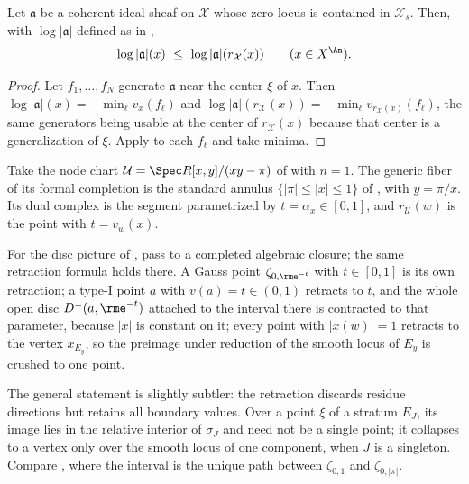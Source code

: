 \begin{corollary}
\label{cor:retraction-ideal-monotone}
Let $\mathfrak a$ be a coherent ideal sheaf on $\mathcal X$ whose
zero locus is contained in $\mathcal X_s$. Then, with
$\log|\mathfrak a|$ defined as in
,
\[
 \log|\mathfrak a|(x)\ \le\ \log|\mathfrak a|(r_{\mathcal X}(x))
 \qquad(x\in X^{\An}).
\]
\end{corollary}

\begin{proof}
Let $f_1,\ldots,f_N$ generate $\mathfrak a$ near the center $\xi$ of
$x$. Then
$\log|\mathfrak a|(x)=-\min_\ell v_x(f_\ell)$ and
$\log|\mathfrak a|(r_{\mathcal X}(x))=-\min_\ell
v_{r_{\mathcal X}(x)}(f_\ell)$, the same generators being usable at the
center of $r_{\mathcal X}(x)$ because that center is a generalization of
$\xi$. Apply  to each $f_\ell$ and take
minima.
\end{proof}

\begin{example}
\label{ex:retraction-annulus}
Take the node chart $\mathcal U=\Spec R[x,y]/(xy-\pi)$ of
 with $n=1$. The generic fiber of its formal
completion is the standard annulus $\{|\pi|\le|x|\le1\}$ of
, with
$y=\pi/x$. Its dual complex is the segment parametrized by
$t=\alpha_x\in[0,1]$, and $r_{\mathcal U}(w)$ is the point with
$t=v_w(x)$.

For the disc picture of , pass to a
completed algebraic closure; the same retraction formula holds there.
A Gauss point
$\zeta_{0,\rme^{-t}}$ with $t\in[0,1]$ is its own retraction; a type-I
point $a$ with $v(a)=t\in(0,1)$ retracts to $t$, and the whole open
disc $D^-(a,\rme^{-t})$ attached to the interval there is contracted to
that parameter, because $|x|$ is constant on it; every point with
$|x(w)|=1$ retracts to the vertex $x_{E_y}$, so the preimage under
reduction of the smooth locus of $E_y$ is crushed to one point.

The general statement is slightly subtler: the retraction discards residue
directions but retains all boundary values.  Over a point $\xi$ of a
stratum $E_J$, its image lies in the relative interior of $\sigma_J$ and
need not be a single point; it collapses to a vertex only over the smooth
locus of one component, when $J$ is a singleton. Compare
, where the interval is the unique path between
$\zeta_{0,1}$ and $\zeta_{0,|\pi|}$.
\end{example}

